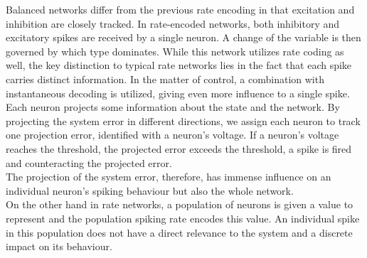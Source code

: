 Balanced networks differ from the previous rate encoding in that excitation and inhibition are closely tracked. In rate-encoded networks, both inhibitory and excitatory spikes are received by a single neuron. A change of the variable is then governed by which type dominates. While this network utilizes rate coding as well, the key distinction to typical rate networks lies in the fact that each spike carries distinct information. In the matter of control, a combination with instantaneous decoding is utilized\cite{johnson_minimum-error_2016}, giving even more influence to a single spike. \\
Each neuron projects some information about the state and the network. By projecting the system error in different directions, we assign each neuron to track one projection error, identified with a neuron's voltage. If a neuron's voltage reaches the threshold, the projected error exceeds the threshold, a spike is fired and counteracting the projected error.\\
The projection of the system error, therefore, has immense influence on an individual neuron's spiking behaviour but also the whole network.\\
On the other hand in rate networks, a population of neurons is given a value to represent and the population spiking rate encodes this value. An individual spike in this population does not have a direct relevance to the system and a discrete impact on its behaviour.\\

